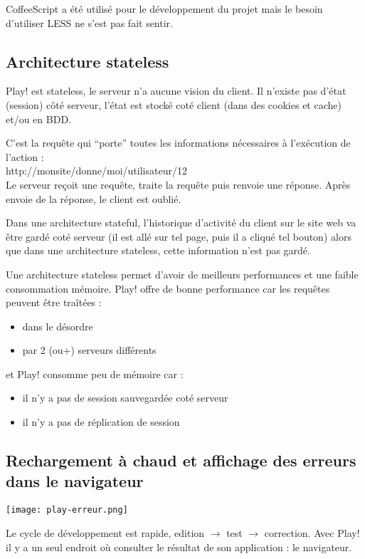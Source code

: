 \bigskip

CoffeeScript a été utilisé pour le développement du projet mais le besoin
d'utiliser LESS ne s'est pas fait sentir.

\subsection{Architecture stateless}

Play! est stateless, le serveur n'a aucune vision du client.
Il n'existe pas d'état (session) côté serveur, l'état est stocké coté client (dans
des cookies et cache) et/ou en BDD.
\bigskip

C'est la requête qui ``porte'' toutes les informations nécessaires à l'exécution
de l'action :\\
http://monsite/donne/moi/utilisateur/12 \\
Le serveur reçoit une requête, traite la requête puis renvoie une réponse.
Après envoie de la réponse, le client est oublié.

Dans une architecture stateful, l'historique d'activité du client sur le site
web va être gardé coté serveur (il est allé sur tel page, puis il a cliqué tel
bouton) alors que dans une architecture stateless, cette information n'est pas
gardé.

Une architecture stateless permet d'avoir de meilleurs performances et une
faible consommation mémoire. Play! offre de bonne performance car les requêtes
peuvent être traîtées : 
\begin{itemize}
\item dans le désordre
\item par 2 (ou+) serveurs différents
\end{itemize}
et Play! consomme peu de mémoire car :
\begin{itemize}
\item il n'y a pas de session sauvegardée coté serveur
\item il n'y a pas de réplication de session
\end{itemize}

\subsection{Rechargement à chaud et affichage des erreurs dans le navigateur}

\texttt{[image: play-erreur.png]}  

Le cycle de développement est rapide, edition $\rightarrow$ test $\rightarrow$ correction.
Avec Play! il y a un seul endroit où consulter le résultat de son
application : le navigateur. 

